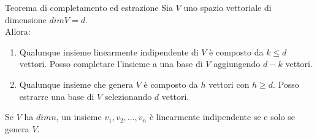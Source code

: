 \documentclass[a4paper]{article}
\theoremstyle{definition}
\begin{document}
\begin{teo}{Teorema di completamento ed estrazione}{}
	Sia $V$ uno spazio vettoriale di dimensione $dim V = d$. \\
	Allora:
	\begin{enumerate}
		\item Qualunque insieme linearmente indipendente di $V$ è composto da $k \leq d$ vettori.
		    Posso completare l'insieme a una base di $V$ aggiungendo $d - k$ vettori.
		\item Qualunque insieme che genera $V$ è composto da $h$ vettori con $h \geq d$.
		    Posso estrarre una base di $V$ selezionando $d$ vettori.
	\end{enumerate}
\end{teo}

\begin{cor}{}{}
	Se $V$ ha $dim n$, un insieme $v_1, v_2, ..., v_n$ è linearmente indipendente se e solo se genera $V$.
\end{cor}
\end{document}
